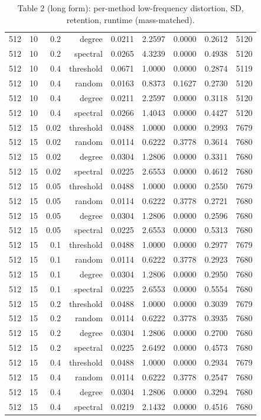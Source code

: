 \begin{table}[t]
\begin{tabular}{lrrrrrrrr}
512 & 10 & 0.2 & degree & 0.0211 & 2.2597 & 0.0000 & 0.2612 & 5120 \\
512 & 10 & 0.2 & spectral & 0.0265 & 4.3239 & 0.0000 & 0.4938 & 5120 \\
512 & 10 & 0.4 & threshold & 0.0671 & 1.0000 & 0.0000 & 0.2874 & 5119 \\
512 & 10 & 0.4 & random & 0.0163 & 0.8373 & 0.1627 & 0.2730 & 5120 \\
512 & 10 & 0.4 & degree & 0.0211 & 2.2597 & 0.0000 & 0.3118 & 5120 \\
512 & 10 & 0.4 & spectral & 0.0266 & 1.4043 & 0.0000 & 0.4427 & 5120 \\
512 & 15 & 0.02 & threshold & 0.0488 & 1.0000 & 0.0000 & 0.2993 & 7679 \\
512 & 15 & 0.02 & random & 0.0114 & 0.6222 & 0.3778 & 0.3614 & 7680 \\
512 & 15 & 0.02 & degree & 0.0304 & 1.2806 & 0.0000 & 0.3311 & 7680 \\
512 & 15 & 0.02 & spectral & 0.0225 & 2.6553 & 0.0000 & 0.4612 & 7680 \\
512 & 15 & 0.05 & threshold & 0.0488 & 1.0000 & 0.0000 & 0.2550 & 7679 \\
512 & 15 & 0.05 & random & 0.0114 & 0.6222 & 0.3778 & 0.2721 & 7680 \\
512 & 15 & 0.05 & degree & 0.0304 & 1.2806 & 0.0000 & 0.2596 & 7680 \\
512 & 15 & 0.05 & spectral & 0.0225 & 2.6553 & 0.0000 & 0.5313 & 7680 \\
512 & 15 & 0.1 & threshold & 0.0488 & 1.0000 & 0.0000 & 0.2977 & 7679 \\
512 & 15 & 0.1 & random & 0.0114 & 0.6222 & 0.3778 & 0.2923 & 7680 \\
512 & 15 & 0.1 & degree & 0.0304 & 1.2806 & 0.0000 & 0.2950 & 7680 \\
512 & 15 & 0.1 & spectral & 0.0225 & 2.6553 & 0.0000 & 0.5554 & 7680 \\
512 & 15 & 0.2 & threshold & 0.0488 & 1.0000 & 0.0000 & 0.3039 & 7679 \\
512 & 15 & 0.2 & random & 0.0114 & 0.6222 & 0.3778 & 0.3935 & 7680 \\
512 & 15 & 0.2 & degree & 0.0304 & 1.2806 & 0.0000 & 0.2700 & 7680 \\
512 & 15 & 0.2 & spectral & 0.0225 & 2.6492 & 0.0000 & 0.4573 & 7680 \\
512 & 15 & 0.4 & threshold & 0.0488 & 1.0000 & 0.0000 & 0.2934 & 7679 \\
512 & 15 & 0.4 & random & 0.0114 & 0.6222 & 0.3778 & 0.2547 & 7680 \\
512 & 15 & 0.4 & degree & 0.0304 & 1.2806 & 0.0000 & 0.3294 & 7680 \\
512 & 15 & 0.4 & spectral & 0.0219 & 2.1432 & 0.0000 & 0.4516 & 7680 \\
\hline
\end{tabular}
\caption{Table 2 (long form): per-method low-frequency distortion, SD, retention, runtime (mass-matched).}
\end{table}
